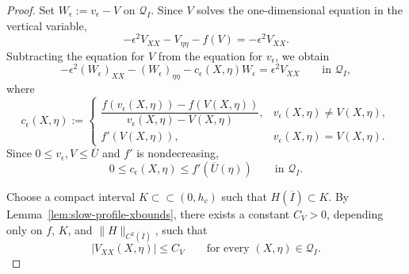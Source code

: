 \documentclass[reqno,12pt]{amsart}
\numberwithin{equation}{section}
\theoremstyle{remark}
\begin{document}
\begin{proof}
Set $W_\epsilon:=v_\epsilon-V$
on $\mathcal Q_I$.  Since $V$ solves the one-dimensional equation in the
vertical variable,
$$
-\epsilon^2V_{XX}-V_{\eta\eta}-f(V)=-\epsilon^2V_{XX}.
$$
Subtracting the equation for $V$ from the equation for $v_\epsilon$, we
obtain
\begin{equation}\label{eq:difference-equation}
-\epsilon^2 (W_\epsilon)_{XX}-(W_\epsilon)_{\eta\eta}-c_\epsilon(X,\eta)W_\epsilon
=\epsilon^2 V_{XX}
\qquad\text{in }\mathcal Q_I,
\end{equation}
where
$$
c_\epsilon(X,\eta):=
\begin{cases}
\dfrac{f(v_\epsilon(X,\eta))-f(V(X,\eta))}{v_\epsilon(X,\eta)-V(X,\eta)},
& v_\epsilon(X,\eta)\ne V(X,\eta),\\
f'(V(X,\eta)),& v_\epsilon(X,\eta)=V(X,\eta).
\end{cases}
$$
Since $0\le v_\epsilon,V\le\overline U$ and $f'$ is nondecreasing,
\begin{equation}\label{eq:ceps-bound}
    0\le c_\epsilon(X,\eta)\le f'(\overline U(\eta))
\qquad\text{in }\mathcal Q_I.
\end{equation}

 


Choose a compact  interval
$K\subset\subset(0,h_c)$ such that $ H(\overline I)\subset K.$
By Lemma~\ref{lem:slow-profile-xbounds}, there exists a constant $C_V>0$,
depending only on $f$, $K$, and $\|H\|_{C^2(\overline I)}$, such that
\begin{equation}\label{eq:VXX-bound}
|V_{XX}(X,\eta)|\le C_V
\qquad\text{for every }(X,\eta)\in\mathcal Q_I.
\end{equation}


\end{proof}
\end{document}
